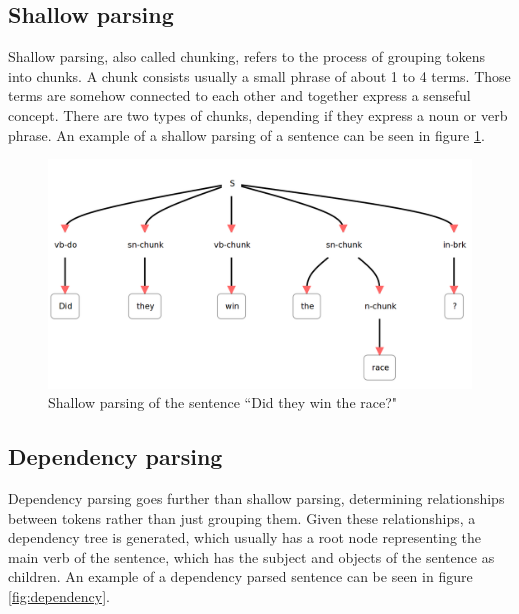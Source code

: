 \documentclass{bsu-ms}
\begin{document}
\subsection{Shallow parsing}
Shallow parsing, also called chunking, refers to the process of grouping tokens into chunks. A chunk consists usually a small phrase of about 1 to 4 terms. Those terms are somehow connected to each other and together express a senseful concept. There are two types of chunks, depending if they express a noun or verb phrase. An example of a shallow parsing of a sentence can be seen in figure \ref{fig:shallow}.

\begin{figure}[h!]
\centering
\includegraphics[width=\textwidth]{shallow}
\caption{Shallow parsing of the sentence ``Did they win the race?"}
\label{fig:shallow}
\end{figure}



\subsection{Dependency parsing}
Dependency parsing goes further than shallow parsing, determining relationships between tokens rather than just grouping them. Given these relationships, a dependency tree is generated, which usually has a root node representing the main verb of the sentence, which has the subject and objects of the sentence as children. An example of a dependency parsed sentence can be seen in figure \ref{fig:dependency}.
\end{document}
